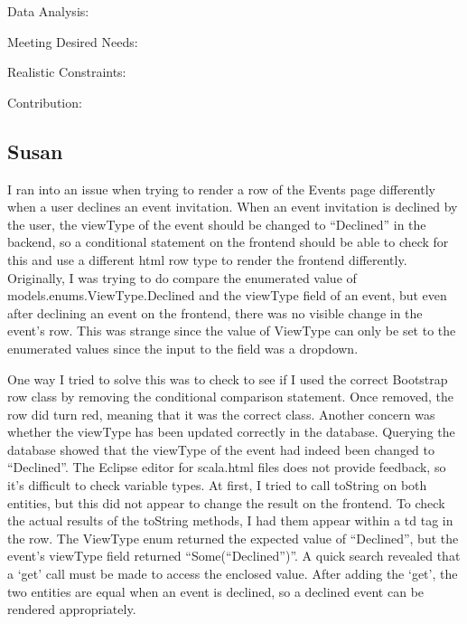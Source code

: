 \documentclass{article}
\begin{document}
Data Analysis: 

Meeting Desired Needs: 

Realistic Constraints:

Contribution:


\subsection{Susan}

I ran into an issue when trying to render a row of the Events page differently when a user declines an event invitation. When an event invitation is declined by the user, the viewType of the event should be changed to “Declined” in the backend, so a conditional statement on the frontend should be able to check for this and use a different html row type to render the frontend differently. Originally, I was trying to do compare the enumerated value of models.enums.ViewType.Declined and the viewType field of an event, but even after declining an event on the frontend, there was no visible change in the event’s row. This was strange since the value of ViewType can only be set to the enumerated values since the input to the field was a dropdown.

	One way I tried to solve this was to check to see if I used the correct Bootstrap row class by removing the conditional comparison statement. Once removed, the row did turn red, meaning that it was the correct class. Another concern was whether the viewType has been updated correctly in the database. Querying the database showed that the viewType of the event had indeed been changed to “Declined”. The Eclipse editor for scala.html files does not provide feedback, so it’s difficult to check variable types. At first, I tried to call toString on both entities, but this did not appear to change the result on the frontend. To check the actual results of the toString methods, I had them appear within a td tag in the row. The ViewType enum returned the expected value of “Declined”, but the event’s viewType field returned “Some(“Declined”)”. A quick search revealed that a ‘get’ call must be made to access the enclosed value. After adding the ‘get’, the two entities are equal when an event is declined, so a declined event can be rendered appropriately.
	
\end{document}
